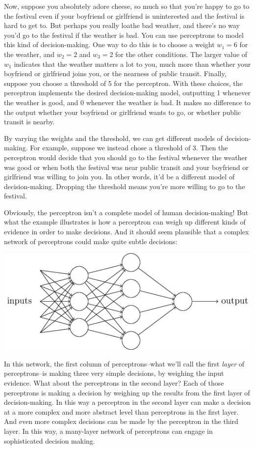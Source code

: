 \documentclass[a4paper,twoside,10pt]{book}
\begin{document}
Now, suppose you absolutely adore cheese, so much so that you're happy to go to the festival even if your boyfriend or girlfriend is uninterested and the festival is hard to get to. But perhaps you really loathe bad weather, and there's no way you'd go to the festival if the weather is bad. You can use perceptrons to model this kind of decision-making. One way to do this is to choose a weight $w_1=6$ for the weather, and $w_2=2$ and $w_3=2$ for the other conditions. The larger value of $w_1$ indicates that the weather matters a lot to you, much more than whether your boyfriend or girlfriend joins you, or the nearness of public transit. Finally, suppose you choose a threshold of 5 for the perceptron. With these choices, the perceptron implements the desired decision-making model, outputting 1 whenever the weather is good, and 0 whenever the weather is bad. It makes no difference to the output whether your boyfriend or girlfriend wants to go, or whether public transit is nearby.

By varying the weights and the threshold, we can get different models of decision-making. For example, suppose we instead chose a threshold of 3. Then the perceptron would decide that you should go to the festival whenever the weather was good or when both the festival was near public transit and your boyfriend or girlfriend was willing to join you. In other words, it'd be a different model of decision-making. Dropping the threshold means you're more willing to go to the festival.

Obviously, the perceptron isn't a complete model of human decision-making! But what the example illustrates is how a perceptron can weigh up different kinds of evidence in order to make decisions. And it should seem plausible that a complex network of perceptrons could make quite subtle decisions:
\begin{center}
	\includegraphics[scale=0.5]{./figures/ch1/tikz1}
\end{center}	
In this network, the first column of perceptrons--what we'll call the first \textit{layer} of perceptrons--is making three very simple decisions, by weighing the input evidence. What about the perceptrons in the second layer? Each of those perceptrons is making a decision by weighing up the results from the first layer of decision-making. In this way a perceptron in the second layer can make a decision at a more complex and more abstract level than perceptrons in the first layer. And even more complex decisions can be made by the perceptron in the third layer. In this way, a many-layer network of perceptrons can engage in sophisticated decision making.
\end{document}
